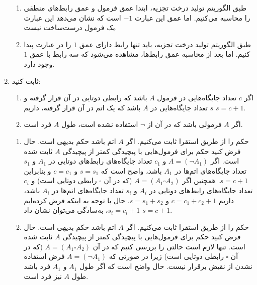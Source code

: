 \documentclass[12pt, 14paper]{article}
\begin{document}
\begin{enumerate}
\begin{ans}
\begin{enumerate}
    \item طبق الگوریتم تولید درخت تجزیه، ابتدا عمق فرمول و عمق رابط‌های منطقی را محاسبه می‌کنیم. اما عمق این عبارت $-1$ است که نشان می‌دهد این عبارت یک فرمول درست‌ساخت نیست.

    \item طبق الگوریتم تولید درخت تجزیه، باید تنها رابط دارای عمق $1$ را در عبارت پیدا کنیم. اما بعد از محاسبه عمق رابط‌ها، مشاهده می‌شود که سه رابط با عمق $1$ وجود دارد.
  \end{enumerate}
\end{ans}

\item
ثابت کنید:
\begin{enumerate}
\item
اگر $c$ تعداد جایگاه‌هایی در فرمول $A$ باشد که رابطی دوتایی در آن قرار گرفته و $s$ تعداد جایگاه‌هایی در $A$ باشد که یک اتم در آن قرار گرفته، داریم $s=c+1$.
\item
اگر $A$ فرمولی باشد که در آن از $\neg$ استفاده نشده است، طول $A$ فرد است.
\end{enumerate}\quad\vspace{-9mm}
\begin{ans}
  \begin{enumerate}
    \item
    حکم را از طریق استقرا ثابت می‌کنیم. اگر $A$ اتم باشد حکم بدیهی است. حال فرض کنید حکم برای فرمول‌هایی با پیچیدگی کمتر از پیچیدگی $A$ ثابت شده است. اگر $A=(\neg A_1)$ و $c_1$ تعداد جایگاه‌های رابط‌های دوتایی در $A_1$ و $s_1$ تعداد جایگاه‌های اتم‌ها در $A_1$ باشد، واضح است که $s=s_1$ و $c=c_1$ و بنابراین $s=c+1$. همچنین اگر $A=(A_1\square A_2)$ (که در آن $\square$ رابطی دوتایی است) و $c_i$ تعداد جایگاه‌های رابط‌های دوتایی در $A_i$ و $s_i$ تعداد جایگاه‌های اتم‌ها در $A_i$ باشد، داریم $c=c_1+c_2+1$ و $s=s_1+s_2$. حال با توجه به اینکه فرض کرده‌ایم $s_i=c_i+1$، به‌سادگی می‌توان نشان داد $s=c+1$.
    
    
    \item
    حکم را از طریق استقرا ثابت می‌کنیم. اگر $A$ اتم باشد حکم بدیهی است. حال فرض کنید حکم برای فرمول‌هایی با پیچیدگی کمتر از پیچیدگی $A$ ثابت شده است. تنها لازم است حالتی را بررسی کنیم که در آن $A=(A_1\square A_2)$ (که در آن $\square$ رابطی دوتایی است) زیرا در صورتی که $A=(\neg A_1)$ فرض استفاده نشدن از نقیض برقرار نیست. حال واضح است که اگر طول $A_1$ و $A_1$ فرد باشد طول $A$ نیز فرد است.
    
  \end{enumerate}
\end{ans}


\end{enumerate}
\end{document}
